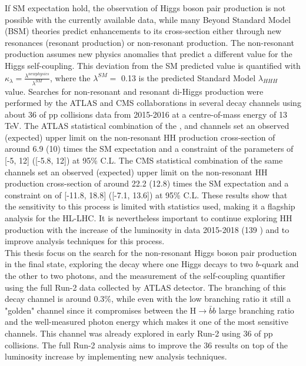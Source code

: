 If SM expectation hold, the observation of Higgs boson pair production is not possible with the currently available data, while many Beyond Standard Model (BSM) theories predict enhancements to its cross-section either through new resonances (resonant production) or non-resonant production. The non-resonant production assumes new physics anomalies that predict a different value for the Higgs self-coupling. This deviation from the SM predicted value is quantified with $\kappa_{\lambda} = \frac{\lambda^{new physics}}{\lambda^{SM}}$, where the $\lambda^{SM} = $ 0.13 is the predicted Standard Model $\lambda_{HHH}$ value. Searches for non-resonant and resonant di-Higgs production were performed by the ATLAS and CMS collaborations in several decay channels using about 36 \ifb of pp collisions data from 2015-2016 at a centre-of-mass energy of 13 TeV. The ATLAS statistical combination of the \bbbb, \bbtt and \bbyy channels set an observed (expected) upper limit on the non-resonant HH production cross-section of around 6.9 (10) times the SM expectation and a constraint of the \kl parameters of [-5, 12] ([-5.8, 12]) at 95\% C.L. The CMS statistical combination of the same channels set an observed (expected) upper limit on the non-resonant HH production cross-section of around 22.2 (12.8) times the SM expectation and a constraint on \kl of [-11.8, 18.8] ([-7.1, 13.6]) at 95\% C.L. These results show that the sensitivity to this process is limited with statistics used, making it a flagship analysis for the HL-LHC. It is nevertheless important to continue exploring HH production with the increase of the luminosity in data 2015-2018 (139 \ifb) and to improve analysis techniques for this process. \\

This thesis focus on the search for the non-resonant Higgs boson pair production in the \bbyy final state, exploring the decay where one Higgs decays to two $b$-quark and the other to two photons, and the measurement of the self-coupling quantifier \kl using the full Run-2 data collected by ATLAS detector. The branching of this decay channel is around 0.3\%, while even with the low branching ratio it still a "golden" channel since it compromises between the H$\to\bar{b}b$ large branching ratio and the well-measured photon energy which makes it one of the most sensitive channels. This channel was already explored in early Run-2 using 36 \ifb of pp collisions. The full Run-2 analysis aims to improve the 36 \ifb results on top of the luminosity increase by implementing new analysis techniques. \\

